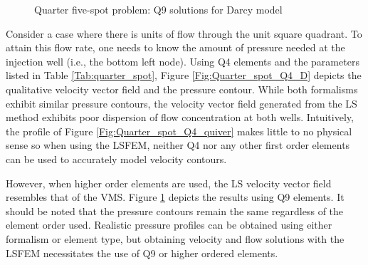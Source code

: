 \documentclass[11pt,reqno]{amsart}
\begin{document}
\begin{figure}[t!]
  \centering
  \caption{Quarter five-spot problem: Q9 solutions for Darcy model}
  \label{Fig:Quarter_spot_Q9_D}
\end{figure}

Consider a case where there is  units of flow through the unit 
square quadrant. To attain this flow rate, one needs to know the
amount of pressure needed at the injection well (i.e., the bottom left node). 
Using Q4 elements and the parameters listed in Table \ref{Tab:quarter_spot}, 
Figure \ref{Fig:Quarter_spot_Q4_D} depicts the qualitative velocity vector field and the 
pressure contour. While both formalisms exhibit similar pressure contours, the velocity 
vector field generated from the LS method exhibits poor dispersion of flow concentration 
at both wells. Intuitively, the profile of Figure \ref{Fig:Quarter_spot_Q4_quiver} makes 
little to no physical sense so when using the LSFEM, neither Q4 nor any other first 
order elements can be used to accurately model velocity contours.

However, when higher order elements are used, the LS velocity vector field resembles 
that of the VMS. Figure \ref{Fig:Quarter_spot_Q9_D} depicts the results
using Q9 elements. It should be noted that the pressure contours remain the same 
regardless of the element order used. Realistic pressure profiles can be 
obtained using either formalism or element type, but obtaining velocity and flow 
solutions with the LSFEM necessitates the use of Q9 or higher ordered elements.
\end{document}
